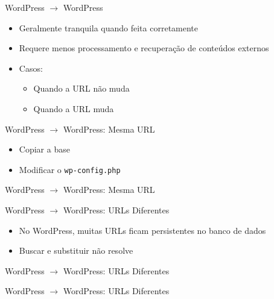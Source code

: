 \documentclass{beamer}
\begin{document}
\begin{frame}{WordPress $\rightarrow$ WordPress}
\begin{itemize}
  \pause \item Geralmente tranquila quando feita corretamente
  \pause \item Requere menos processamento e recuperação de conteúdos
               externos
  \pause \item Casos:
    \begin{itemize}
      \pause \item Quando a URL não muda
      \pause \item Quando a URL muda
    \end{itemize}
\end{itemize}
\end{frame}

\begin{frame}{WordPress $\rightarrow$ WordPress: Mesma URL}
\begin{itemize}
  \pause \item Copiar a base
  \pause \item Modificar o \texttt{wp-config.php}
\end{itemize}
\end{frame}

\begin{frame}[fragile]{WordPress $\rightarrow$ WordPress: Mesma URL}
  
\end{frame}

\begin{frame}{WordPress $\rightarrow$ WordPress: URLs Diferentes}
\begin{itemize}
  \pause \item No WordPress, muitas URLs ficam persistentes no banco de dados
  \pause \item Buscar e substituir não resolve
\end{itemize}
\end{frame}

\begin{frame}[fragile]{WordPress $\rightarrow$ WordPress: URLs Diferentes}
  
  \pause
  
\end{frame}

\begin{frame}[fragile]{WordPress $\rightarrow$ WordPress: URLs Diferentes}
  
  \pause
  
  \pause
  
\end{frame}
\end{document}
